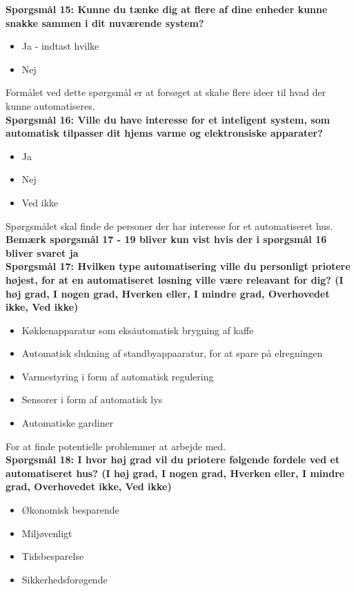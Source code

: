 {\bf{Spørgsmål 15: Kunne du tænke dig at flere af dine enheder kunne snakke sammen i dit nuværende system?}}
\begin{itemize}
    \item Ja - indtast hvilke
    \item Nej
\end{itemize}

Formålet ved dette spørgsmål er at forsøget at skabe flere ideer til hvad der kunne automatiseres.\\

{\bf{Spørgsmål 16: Ville du have interesse for et inteligent system, som automatisk tilpasser dit hjems varme og elektronsiske apparater?}}
\begin{itemize}
    \item Ja
    \item Nej
    \item Ved ikke
\end{itemize}

Spørgsmålet skal finde de personer der har interesse for et automatiseret hus.\\
{\bf{Bemærk spørgsmål 17 - 19 bliver kun vist hvis der i spørgsmål 16 bliver svaret ja}}\\
{\bf{Spørgsmål 17: Hvilken type automatisering ville du personligt priotere højest, for at en automatiseret løsning ville være releavant for dig? (I høj grad, I nogen grad, Hverken eller, I mindre grad, Overhovedet ikke, Ved ikke)}}
\begin{itemize}
    \item Køkkenapparatur som eks\. automatisk brygning af kaffe
    \item Automatisk slukning af standbyappaaratur, for at spare på elregningen
    \item Varmestyring i form af automatisk regulering
    \item Sensorer i form af automatisk lys
    \item Automatiske gardiner
\end{itemize}

For at finde potentielle problemmer at arbejde med.\\
{\bf{Spørgsmål 18: I hvor høj grad vil du priotere følgende fordele ved et automatiseret hus? (I høj grad, I nogen grad, Hverken eller, I mindre grad, Overhovedet ikke, Ved ikke)}}
\begin{itemize}
    \item Økonomisk besparende
    \item Miljøvenligt
    \item Tidsbesparelse
    \item Sikkerhedsforøgende
\end{itemize}


